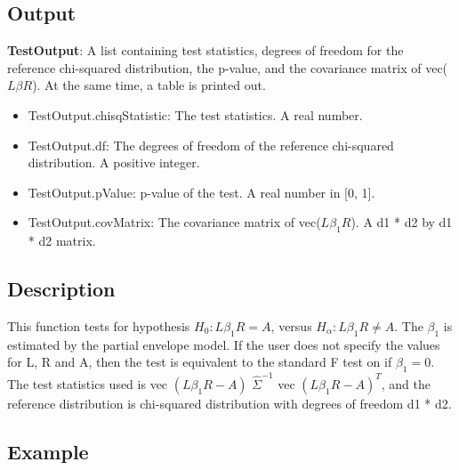 \documentclass[a4paper,11pt,openany]{memoir}
\begin{document}
\subsection*{Output}

\begin{par}
\textbf{TestOutput}: A list containing test statistics, degrees of freedom for the reference chi-squared distribution, the p-value, and the covariance matrix of vec($L\beta R$).  At the same time, a table is printed out.
\end{par} \vspace{1em}
\begin{itemize}
\setlength{\itemsep}{-1ex}
   \item TestOutput.chisqStatistic: The test statistics. A real number.
   \item TestOutput.df: The degrees of freedom of the reference chi-squared distribution.  A positive integer.
   \item TestOutput.pValue: p-value of the test.  A real number in [0, 1].
   \item TestOutput.covMatrix: The covariance matrix of vec($L\beta_1 R$). A d1 * d2 by d1 * d2 matrix.
\end{itemize}

\subsection*{Description}

\begin{par}
This function tests for hypothesis $H_0: L\beta_1 R = A$, versus $H_\alpha: L\beta_1 R\neq A$.  The $\beta_1$ is estimated by the partial envelope model.  If the user does not specify the values for L, R and A, then the test is equivalent to the standard F test on if $\beta_1 = 0$.  The test statistics used is vec $(L\beta_1 R - A)$ $\hat{\Sigma}^{-1}$ vec $(L\beta_1 R - A)^{T}$, and the reference distribution is chi-squared distribution with degrees of freedom d1 * d2.
\end{par} \vspace{1em}


\subsection*{Example}
\end{document}
